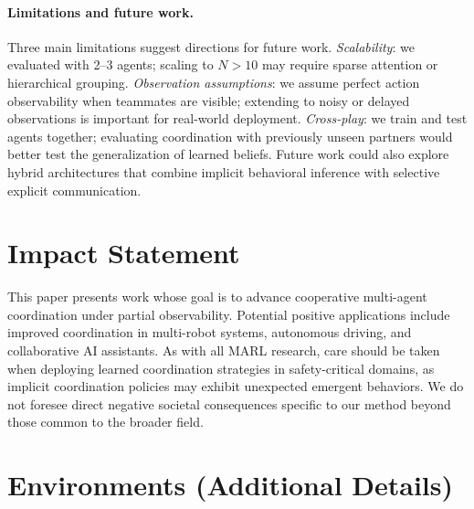 \documentclass{article}
\theoremstyle{plain}
\theoremstyle{definition}
\theoremstyle{remark}
\begin{document}
\paragraph{Limitations and future work.}
Three main limitations suggest directions for future work. \textit{Scalability}: we evaluated with 2--3 agents; scaling to $N > 10$ may require sparse attention or hierarchical grouping. \textit{Observation assumptions}: we assume perfect action observability when teammates are visible; extending to noisy or delayed observations is important for real-world deployment. \textit{Cross-play}: we train and test agents together; evaluating coordination with previously unseen partners would better test the generalization of learned beliefs. Future work could also explore hybrid architectures that combine implicit behavioral inference with selective explicit communication.


\section{Impact Statement}

This paper presents work whose goal is to advance cooperative multi-agent coordination under partial observability. Potential positive applications include improved coordination in multi-robot systems, autonomous driving, and collaborative AI assistants. As with all MARL research, care should be taken when deploying learned coordination strategies in safety-critical domains, as implicit coordination policies may exhibit unexpected emergent behaviors. We do not foresee direct negative societal consequences specific to our method beyond those common to the broader field.




\newpage
\appendix
\onecolumn

\section{Environments (Additional Details)}
\label{app:env_details}
\end{document}
